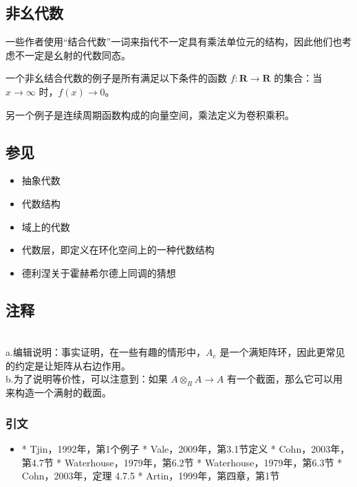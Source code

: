 \subsection{非幺代数}
一些作者使用“结合代数”一词来指代不一定具有乘法单位元的结构，因此他们也考虑不一定是幺射的代数同态。

一个非幺结合代数的例子是所有满足以下条件的函数 $f : \mathbf{R} \to \mathbf{R}$ 的集合：当 $x \to \infty$ 时，$f(x) \to 0$。

另一个例子是连续周期函数构成的向量空间，乘法定义为卷积乘积。
\subsection{参见}
\begin{itemize}
\item 抽象代数
\item 代数结构
\item 域上的代数
\item 代数层，即定义在环化空间上的一种代数结构
\item 德利涅关于霍赫希尔德上同调的猜想
\end{itemize}
\subsection{注释}\\
a.编辑说明：事实证明，在一些有趣的情形中，$A_e$ 是一个满矩阵环，因此更常见的约定是让矩阵从右边作用。\\
b.为了说明等价性，可以注意到：如果 $A \otimes_R A \to A$ 有一个截面，那么它可以用来构造一个满射的截面。
\subsubsection{引文}

\begin{itemize}
\item * Tjin，1992年，第1个例子
* Vale，2009年，第3.1节定义
* Cohn，2003年，第4.7节
* Waterhouse，1979年，第6.2节
* Waterhouse，1979年，第6.3节
* Cohn，2003年，定理 4.7.5
* Artin，1999年，第四章，第1节
\end{itemize}
